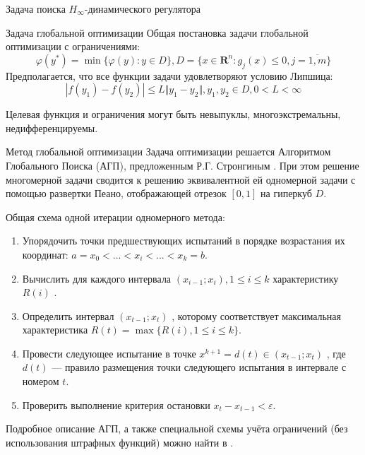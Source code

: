 \documentclass{beamer}
\begin{document}
\begin{frame}[t]
\begin{columns}[t]
\begin{column}[t]{0.48\paperwidth}
\begin{block}{Задача поиска $H_{\infty}$-динамического регулятора}
          \end{block}
            \begin{block}{Задача глобальной оптимизации}
              Общая постановка задачи глобальной оптимизации с ограничениями:
              \begin{displaymath}
                \varphi(y^*)=\min\{\varphi(y):y\in D\}, D=\{x\in \mathbf{R}^n: g_j(x) \leqslant 0, j=\overline{1,m}\}
              \end{displaymath}
              Предполагается, что все функции задачи удовлетворяют условию Липшица:
              \begin{displaymath}
              |f(y_1)-f(y_2)|\leqslant L\Vert y_1-y_2\Vert,y_1,y_2\in D,0<L<\infty
              \end{displaymath}

              Целевая функция и ограничения могут быть невыпуклы, многоэкстремальны, недифференцируемы.
            \end{block}
            \begin{block}{Метод глобальной оптимизации}
              Задача оптимизации решается Алгоритмом Глобального Поиска (АГП), предложенным Р.Г. Стронгиным \cite{strOptBook}. При этом решение многомерной задачи сводится к решению эквивалентной ей одномерной задачи с помощью развертки Пеано, отображающей отрезок $[0,1]$  на гиперкуб $D$.

              Общая схема одной итерации одномерного метода:
              \begin{enumerate}
                \justifying
                \item Упорядочить точки предшествующих испытаний в порядке возрастания их координат: \(a=x_{0}<...<x_{i}<...<x_{k}=b\).
                \item Вычислить для каждого интервала \((x_{i-1};x_{i}),1\leq i\leq k\)  характеристику \(R(i)\) .
                \item Определить интервал \((x_{t-1};x_{t})\) , которому соответствует максимальная характеристика \(R(t)=\max\{R(i),1\leq i\leq k\}\).
                \item Провести следующее испытание в точке \(x^{k+1}=d(t)\in (x_{t-1};x_{t})\) , где \(d(t)\)  — правило размещения точки следующего испытания в интервале с номером \(t\).
                \item Проверить выполнение критерия остановки \(x_{t}-x_{t-1}<\varepsilon\).
              \end{enumerate}
              Подробное описание АГП, а также специальной схемы учёта ограничений (без использования штрафных функций) можно найти в \cite{strOptBook}.


\end{block}
\end{column}
\end{columns}
\end{frame}
\end{document}
